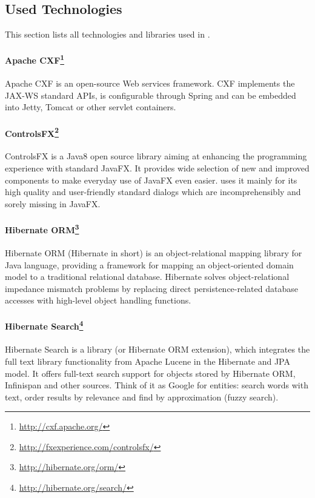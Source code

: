 
\subsection{Used Technologies}

This section lists all technologies and libraries used in \textan{}.

\paragraph{Apache CXF\footnote{\url{http://cxf.apache.org/}}}
Apache CXF is an open-source Web services framework. CXF implements the JAX-WS 
standard APIs, is configurable through Spring and can be embedded into Jetty,
Tomcat or other servlet containers.

\paragraph{ControlsFX\footnote{\url{http://fxexperience.com/controlsfx/}}}
ControlsFX is a Java8 open source library aiming at enhancing the programming
experience with standard JavaFX. It provides wide selection of new and improved
components to make everyday use of JavaFX even easier. \textan{} uses it mainly for
its high quality and user-friendly standard dialogs which are incomprehensibly
and sorely missing in JavaFX.

\paragraph{Hibernate ORM\footnote{\url{http://hibernate.org/orm/}}}
Hibernate ORM (Hibernate in short) is an object-relational mapping library for
Java language, providing a framework for mapping an object-oriented domain
model to a traditional relational database. Hibernate solves object-relational
impedance mismatch problems by replacing direct persistence-related database
accesses with high-level object handling functions.

\paragraph{Hibernate Search\footnote{\url{http://hibernate.org/search/}}}
Hibernate Search is a library (or Hibernate ORM extension), which integrates
the full text library functionality from Apache Lucene in the Hibernate and
JPA model. It offers full-text search support for objects stored by Hibernate
ORM, Infinispan and other sources. Think of it as Google\texttrademark{} for
entities: search words with text, order results by relevance and find by
approximation (fuzzy search).


